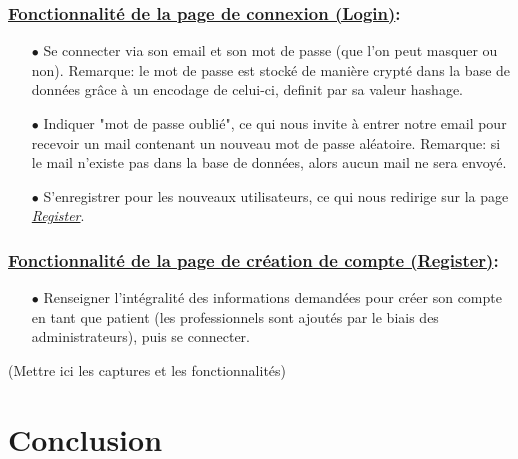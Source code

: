 \documentclass[a4paper]{report}
\begin{document}
\subsection{\underline{Fonctionnalité de la page de connexion (Login)}:}\label{login}
    \begin{itemize}
        \item[$\bullet$] Se connecter via son email et son mot de passe (que l’on peut masquer ou non). {\fontsize{8}{14}\selectfont Remarque: le mot de passe est stocké de manière crypté dans la base de données grâce à un encodage de celui-ci, definit par sa valeur hashage.}
        \item[$\bullet$] Indiquer "mot de passe oublié", ce qui nous invite à entrer notre email pour recevoir un mail contenant un nouveau mot de passe aléatoire. {\fontsize{8}{14}\selectfont Remarque: si le mail n'existe pas dans la base de données, alors aucun mail ne sera envoyé.}
        \item[$\bullet$] S’enregistrer pour les nouveaux utilisateurs, ce qui nous redirige sur la page \textit{\hyperref[register]{Register}}.
    \end{itemize}
    \vspace{3mm}

\subsection{\underline{Fonctionnalité de la page de création de compte (Register)}:}\label{register}
    \begin{itemize}
        \item[$\bullet$] Renseigner l'intégralité des informations demandées pour créer son compte en tant que patient (les professionnels sont ajoutés par le biais des administrateurs), puis se connecter.
    \end{itemize}

\vspace{2cm}

(Mettre ici les captures et les fonctionnalités)

\chapter{Conclusion}
\end{document}

